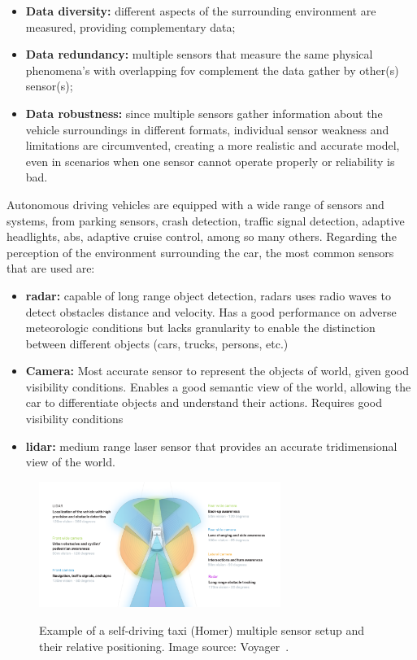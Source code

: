\begin{itemize}
	\item \textbf{Data diversity:} different aspects of the surrounding environment are measured, providing complementary data;
	\item \textbf{Data redundancy:} multiple sensors that measure the same physical phenomena's with overlapping \ac{fov} complement the data gather by other(s) sensor(s);
	\item \textbf{Data robustness:} since multiple sensors gather information about the vehicle surroundings in different formats, individual sensor weakness and limitations are circumvented, creating a more realistic and accurate model, even in scenarios when one sensor cannot operate properly or reliability is bad.
\end{itemize}

Autonomous driving vehicles are equipped with a wide range of sensors and systems, from parking sensors, crash detection, traffic signal detection, adaptive headlights, \ac{abs}, adaptive cruise control, among so many others. Regarding the perception of the environment surrounding the car, the most common sensors that are used are:

\begin{itemize}
	\item \textbf{\ac{radar}:} capable of long range object detection, \acp{radar} uses radio waves to detect obstacles distance and velocity. Has a good performance on adverse meteorologic conditions but lacks granularity to enable the distinction between different objects (cars, trucks, persons, etc.)
	\item \textbf{Camera:} Most accurate sensor to represent the objects of world, given good visibility conditions. Enables a good semantic view of the world, allowing the car to differentiate objects and understand their actions. Requires good visibility conditions 
	\item \textbf{\ac{lidar}:} medium range laser sensor that provides an accurate tridimensional view of the world.
\end{itemize}

\begin{figure}
	\centering
	\includegraphics[width=0.7\textwidth]{img/sensor_fusion/homer_setup.png}
	\label{fig:introduction:homer_setup}
	\caption{Example of a self-driving taxi (Homer) multiple sensor setup and their relative positioning. Image source: Voyager~\cite{Cameron}.}
\end{figure}

